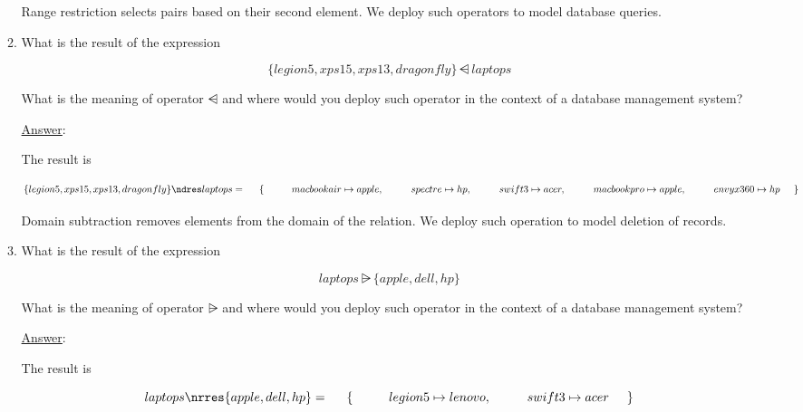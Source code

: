\documentclass[12pt]{article}
\begin{document}
\begin{enumerate}
\begin{enumerate}
\noindent Range restriction selects pairs based on their second element. We deploy such operators to model database queries. 


\item What is the result of the expression

\[ \{ legion5, xps15, xps13, dragonfly \} \ndres laptops \]

\noindent What is the meaning of operator $\ndres$ and where would you deploy such operator in the context of a database management system?

\noindent \underline{Answer}:

\noindent \noindent The result is 

\[ \{ legion5, xps15, xps13, dragonfly \} \ndres laptops = \\
\hspace{5mm} \{ \\
\hspace{10mm} macbookair \mapsto apple,\\
\hspace{10mm} spectre \mapsto hp,\\
\hspace{10mm} swift3 \mapsto acer,\\
\hspace{10mm} macbookpro \mapsto apple,\\
\hspace{10mm} envyx360 \mapsto hp\\
\hspace{5mm} \}
\]

\noindent  Domain subtraction removes elements from the domain of the relation. We deploy such operation to model deletion of records. 


\item What is the result of the expression

\[ laptops \nrres \{ apple, dell, hp \} \]

\noindent What is the meaning of operator $\nrres$ and where would you deploy such operator in the context of a database management system?

\newpage

\noindent \underline{Answer}:


\noindent \noindent The result is 

\[
laptops \nrres \{ apple, dell, hp \} = \\
\hspace{5mm} \{ \\
\hspace{10mm} legion5 \mapsto lenovo,\\
\hspace{10mm} swift3 \mapsto acer\\
\hspace{5mm} \}
\]
 

\end{enumerate}
\end{enumerate}
\end{document}
